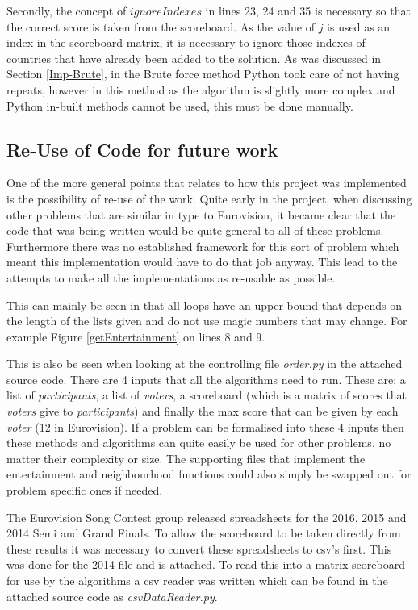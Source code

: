 \documentclass[12pt]{report}
\begin{document}
Secondly, the concept of $ignoreIndexes$ in lines 23, 24 and 35 is necessary so that the correct score is taken from the scoreboard. As the value of $j$ is used as an index in the scoreboard matrix, it is necessary to ignore those indexes of countries that have already been added to the solution. As was discussed in Section \ref{Imp-Brute}, in the Brute force method Python took care of not having repeats, however in this method as the algorithm is slightly more complex and Python in-built methods cannot be used, this must be done manually.

\subsection{Re-Use of Code for future work}\label{Imp-Reuse}
One of the more general points that relates to how this project was implemented is the possibility of re-use of the work. Quite early in the project, when discussing other problems that are similar in type to Eurovision, it became clear that the code that was being written would be quite general to all of these problems. Furthermore there was no established framework for this sort of problem which meant this implementation would have to do that job anyway. This lead to the attempts to make all the implementations as re-usable as possible.

This can mainly be seen in that all loops have an upper bound that depends on the length of the lists given and do not use magic numbers that may change. For example Figure \ref{getEntertainment} on lines 8 and 9. 

This is also be seen when looking at the controlling file \textit{order.py} in the attached source code. There are 4 inputs that all the algorithms need to run. These are: a list of \textit{participants}, a list of \textit{voters}, a scoreboard (which is a matrix of scores that \textit{voters} give to \textit{participants}) and finally the max score that can be given by each \textit{voter} (12 in Eurovision). If a problem can be formalised into these 4 inputs then these methods and algorithms can quite easily be used for other problems, no matter their complexity or size. The supporting files that implement the entertainment and neighbourhood functions could also simply be swapped out for problem specific ones if needed.

The Eurovision Song Contest group released spreadsheets for the 2016, 2015 and 2014 Semi and Grand Finals. To allow the scoreboard to be taken directly from these results it was necessary to convert these spreadsheets to csv's first. This was done for the 2014 file and is attached. To read this into a matrix scoreboard for use by the algorithms a csv reader was written which can be found in the attached source code as \textit{csvDataReader.py}.
\end{document}
